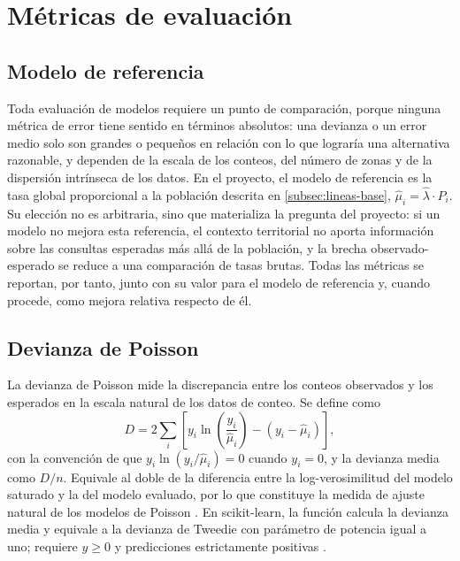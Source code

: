 \section{Métricas de evaluación}
\label{sec:metricas}

\subsection{Modelo de referencia}
\label{subsec:modelo-referencia}

Toda evaluación de modelos requiere un punto de comparación, porque ninguna métrica de error
tiene sentido en términos absolutos: una devianza o un error medio solo son grandes o
pequeños en relación con lo que lograría una alternativa razonable, y dependen de la escala
de los conteos, del número de zonas y de la dispersión intrínseca de los datos. En el
proyecto, el modelo de referencia es la tasa global proporcional a la población descrita en
\ref{subsec:lineas-base}, $\hat{\mu}_i = \hat{\lambda} \cdot P_i$. Su elección no es
arbitraria, sino que materializa la pregunta del proyecto: si un modelo no mejora esta
referencia, el contexto territorial no aporta información sobre las consultas esperadas más
allá de la población, y la brecha observado-esperado se reduce a una comparación de tasas
brutas. Todas las métricas se reportan, por tanto, junto con su valor para el modelo de
referencia y, cuando procede, como mejora relativa respecto de él.

\subsection{Devianza de Poisson}
\label{subsec:devianza-poisson}

La devianza de Poisson mide la discrepancia entre los conteos observados y los esperados en
la escala natural de los datos de conteo. Se define como
\[
  D = 2 \sum_i \left[ y_i \ln\!\left(\frac{y_i}{\hat{\mu}_i}\right) - (y_i - \hat{\mu}_i) \right],
\]
con la convención de que $y_i \ln(y_i / \hat{\mu}_i) = 0$ cuando $y_i = 0$, y la devianza
media como $D / n$. Equivale al doble de la diferencia entre la log-verosimilitud del modelo
saturado y la del modelo evaluado, por lo que constituye la medida de ajuste natural de los
modelos de Poisson \parencite{mccullagh1989}. En scikit-learn, la función
 calcula la devianza media y equivale a la devianza de Tweedie
con parámetro de potencia igual a uno; requiere $y \ge 0$ y predicciones estrictamente
positivas \parencite{sklearn-mpd}.

